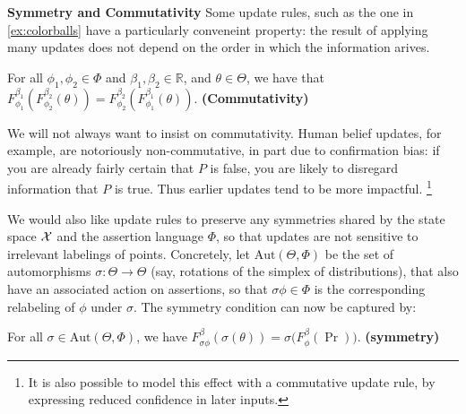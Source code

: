 \documentclass{article}
\begin{document}
\textbf{Symmetry and Commutativity}
Some update rules, such as the one in \cref{ex:colorballs} have a particularly conveneint property: the result of applying many updates does not depend on the order in which the information arives.

\begin{CFaxioms}
    \item For all $\phi_1, \phi_2 \in \Phi$ and $\beta_1, \beta_2 \in \mathbb R$, and
    $\theta \in \Theta$,
    we have that
    $
        F^{\beta_1}_{\phi_1} ( F^{\beta_2}_{\phi_2}(\theta)) =
            F^{\beta_2}_{\phi_2} ( F^{\beta_1}_{\phi_1}(\theta)).
    $
    \hfill\textbf{(Commutativity)} \label{ax:commute}
\end{CFaxioms}

We will not always want to insist on commutativity. Human belief updates, for example, are notoriously non-commutative, in part due to confirmation bias:
if you are already fairly certain that $P$ is false, you are likely to disregard
information that $P$ is true. Thus earlier updates tend to be more impactful.%
\footnote{
    It is also possible to model this effect with a commutative update rule,
    by expressing reduced confidence in later inputs.
}


We would also like update rules to preserve any symmetries shared by the state space $\mathcal X$ and the assertion language $\Phi$, so that updates are not sensitive to irrelevant labelings of points.
Concretely, let $\mathrm{Aut}(\Theta, \Phi)$ be the set of automorphisms $\sigma : \Theta \to \Theta$ (say, rotations of the simplex of distributions), that also have an associated action on assertions, so that $\sigma\phi \in \Phi$ is the corresponding relabeling of $\phi$ under $\sigma$.  The symmetry condition can now be captured by:

\begin{CFaxioms}
    \item
        For all $\sigma
            \in \mathrm{Aut}(\Theta, \Phi)$, we have
        $F^\beta_{\sigma\phi} (\sigma(\theta)) = \sigma \Big( F^\beta_{\phi}(\Pr)\Big)$.
            \hfill \textbf{(symmetry)} \label{ax:symmetry}
        \\
\end{CFaxioms}
\end{document}

